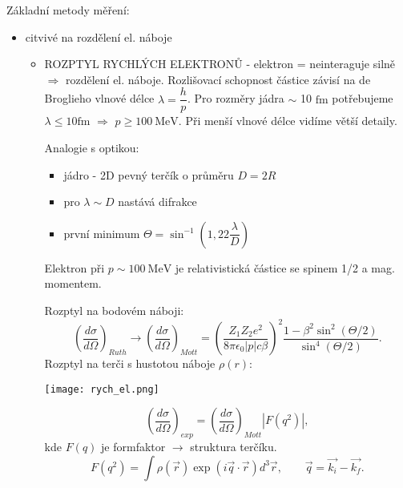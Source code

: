 \documentclass[../../main.tex]{subfiles}
\begin{document}
Základní metody měření:
\begin{itemize}
	\item citvivé na rozdělení el. náboje
	\begin{itemize}
	    \item ROZPTYL RYCHLÝCH ELEKTRONŮ - elektron = neinteraguje silně $\Rightarrow$ rozdělení el. náboje. Rozlišovací schopnost částice závisí na de Broglieho vlnové délce $\lambda = \dfrac{h}{p}$. Pro rozměry jádra $\sim$ 10 $\mathrm{fm}$ potřebujeme $\lambda \leq 10 \mathrm{fm}$ $\Rightarrow$ $p \geq 100 ~\mathrm{MeV}$. Při menší vlnové délce vidíme větší detaily. 
	    
	    Analogie s optikou: 
	    \begin{itemize}
	    	\item jádro - 2D pevný terčík o průměru $D = 2R$
	    	\item pro $ \lambda \sim D$ nastává difrakce
	    	\item první minimum $\Theta = \sin^{-1} (1,22 \dfrac{\lambda}{D})$
	    \end{itemize} 
	    
	    Elektron při $p \sim 100 ~\mathrm{MeV}$ je relativistická částice se spinem 1/2 a mag. momentem.
	    
	    Rozptyl na bodovém náboji: 
	    \begin{equation}
	    \left( \dfrac{d \sigma}{d \Omega }\right)_{Ruth} \rightarrow  \left( \dfrac{d \sigma}{d \Omega }\right)_{Mott} = \left(  \dfrac{Z_1 Z_2 e^2}{8 \pi \epsilon_0 |p| c \beta}\right)^2 \dfrac{1 - \beta^2 \sin^2 (\Theta/2)}{\sin ^4 (\Theta /2)}. 
	    \end{equation}
	    Rozptyl na terči s hustotou náboje $\rho (r)$:
	    
	    	\begin{center}
	    		\texttt{[image: rych\_el.png]}		
	    	\end{center}
	    
	    \begin{equation}
	    \left( \dfrac{d \sigma}{d \Omega}\right) _{exp}  = \left(\dfrac{ d \sigma }{d \Omega}\right)_{Mott} \left| F (q^2)\right|,  
	    \end{equation}
	    kde $F(q)$ je formfaktor $\rightarrow$ struktura terčíku.
	    \begin{equation}
	    F(q^2) = \int \rho (\vec{r}) \exp ( i \vec{q}\cdot \vec{r}) d^3 \vec{r}, ~~~~~~~~~ \vec{q} = \vec{k_i} - \vec{k_f}.
	    \end{equation}
	    

\end{itemize}
\end{itemize}
\end{document}

